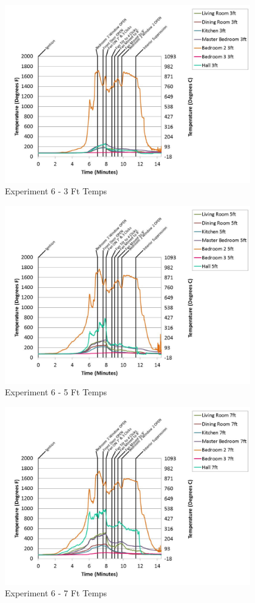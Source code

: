 \documentclass{article}
\begin{document}
\begin{appendices}
	\begin{figure}[h!]
		\centering
		\includegraphics[height=3.05in]{0_Images/Results_Charts/Exp_6_Charts/3FtTemps.pdf}
		\caption{Experiment 6 - 3 Ft Temps}
	\end{figure}
 
	\clearpage

	\begin{figure}[h!]
		\centering
		\includegraphics[height=3.05in]{0_Images/Results_Charts/Exp_6_Charts/5FtTemps.pdf}
		\caption{Experiment 6 - 5 Ft Temps}
	\end{figure}
 

	\begin{figure}[h!]
		\centering
		\includegraphics[height=3.05in]{0_Images/Results_Charts/Exp_6_Charts/7FtTemps.pdf}
		\caption{Experiment 6 - 7 Ft Temps}
	\end{figure}
 

\end{appendices}
\end{document}
